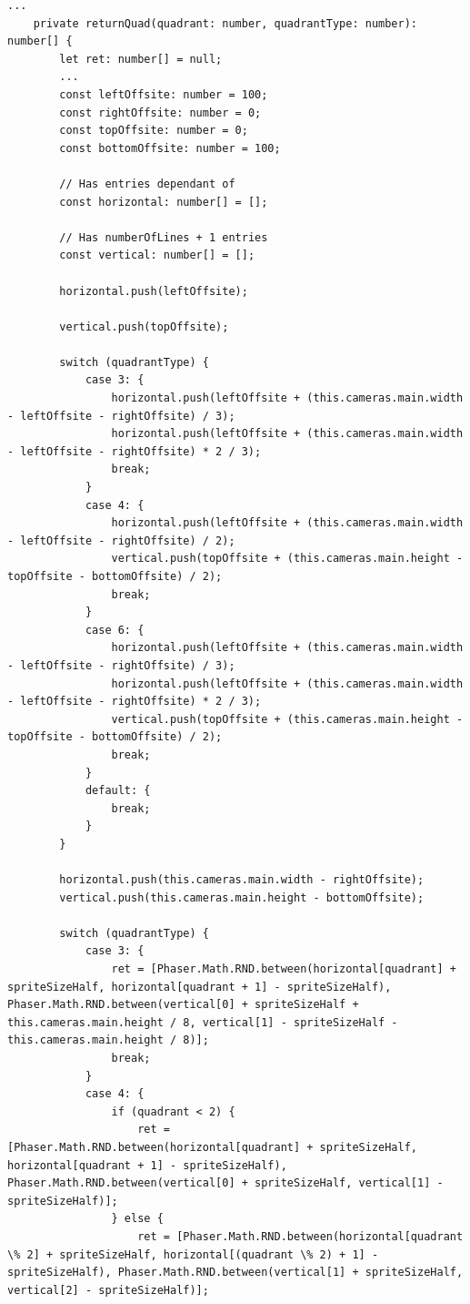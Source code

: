 \begin{lstlisting}[style=TypeScript, caption={returnQuad() (sortingScene.ts)}, label={lst:returnquad}]
    ...
    private returnQuad(quadrant: number, quadrantType: number): number[] {
        let ret: number[] = null;
        ...
        const leftOffsite: number = 100;
        const rightOffsite: number = 0;
        const topOffsite: number = 0;
        const bottomOffsite: number = 100;

        // Has entries dependant of
        const horizontal: number[] = [];

        // Has numberOfLines + 1 entries
        const vertical: number[] = [];

        horizontal.push(leftOffsite);

        vertical.push(topOffsite);

        switch (quadrantType) {
            case 3: {
                horizontal.push(leftOffsite + (this.cameras.main.width - leftOffsite - rightOffsite) / 3);
                horizontal.push(leftOffsite + (this.cameras.main.width - leftOffsite - rightOffsite) * 2 / 3);
                break;
            }
            case 4: {
                horizontal.push(leftOffsite + (this.cameras.main.width - leftOffsite - rightOffsite) / 2);
                vertical.push(topOffsite + (this.cameras.main.height - topOffsite - bottomOffsite) / 2);
                break;
            }
            case 6: {
                horizontal.push(leftOffsite + (this.cameras.main.width - leftOffsite - rightOffsite) / 3);
                horizontal.push(leftOffsite + (this.cameras.main.width - leftOffsite - rightOffsite) * 2 / 3);
                vertical.push(topOffsite + (this.cameras.main.height - topOffsite - bottomOffsite) / 2);
                break;
            }
            default: {
                break;
            }
        }

        horizontal.push(this.cameras.main.width - rightOffsite);
        vertical.push(this.cameras.main.height - bottomOffsite);

        switch (quadrantType) {
            case 3: {
                ret = [Phaser.Math.RND.between(horizontal[quadrant] + spriteSizeHalf, horizontal[quadrant + 1] - spriteSizeHalf), Phaser.Math.RND.between(vertical[0] + spriteSizeHalf + this.cameras.main.height / 8, vertical[1] - spriteSizeHalf - this.cameras.main.height / 8)];
                break;
            }
            case 4: {
                if (quadrant < 2) {
                    ret = [Phaser.Math.RND.between(horizontal[quadrant] + spriteSizeHalf, horizontal[quadrant + 1] - spriteSizeHalf), Phaser.Math.RND.between(vertical[0] + spriteSizeHalf, vertical[1] - spriteSizeHalf)];
                } else {
                    ret = [Phaser.Math.RND.between(horizontal[quadrant \% 2] + spriteSizeHalf, horizontal[(quadrant \% 2) + 1] - spriteSizeHalf), Phaser.Math.RND.between(vertical[1] + spriteSizeHalf, vertical[2] - spriteSizeHalf)];


\end{lstlisting}
